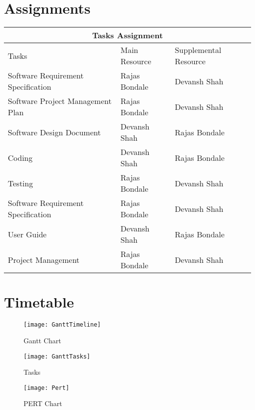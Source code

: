 \documentclass[12pt, letterpaper, twoside]{report}
\begin{document}
\section{Assignments}
\begin{center}
\begin{tabular}{ |p{5cm}||p{4cm}|p{4cm}| }
\hline
\multicolumn{3}{|c|}{Tasks Assignment} \\
\hline
 Tasks & Main Resource& Supplemental Resource\\  
\hline
 Software  Requirement Specification & Rajas Bondale & Devansh Shah\\
\hline
Software Project Management Plan & Rajas Bondale & Devansh Shah\\
\hline
 Software Design Document & Devansh Shah & Rajas Bondale \\
\hline
 Coding & Devansh Shah & Rajas Bondale \\
\hline
 Testing & Rajas Bondale & Devansh Shah\\
\hline
 Software Requirement Specification & Rajas Bondale & Devansh Shah\\
\hline
 User Guide & Devansh Shah & Rajas Bondale \\
\hline
 Project Management & Rajas Bondale & Devansh Shah\\
\hline
\end{tabular}
\end{center}
\section{Timetable}
\begin{figure}[h]
\texttt{[image: GanttTimeline]}
\caption{Gantt Chart}
\end{figure}
\begin{figure}[h]
\texttt{[image: GanttTasks]}
\centering
\caption{Tasks}
\end{figure}
\begin{figure}[h]
\texttt{[image: Pert]}
\caption{PERT Chart}
\end{figure}
\end{document}

